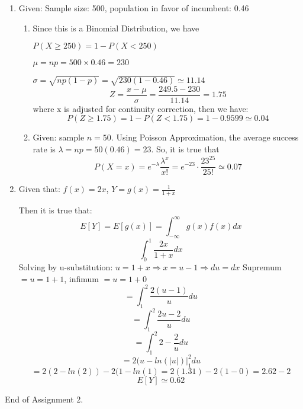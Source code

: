 \documentclass[12pt]{article}
\begin{document}
\begin{enumerate}
		\item Given: Sample size: 500, population in favor of incumbent: 0.46
			\begin{enumerate}
				\item Since this is a Binomial Distribution, we have

				$P(X \geq 250) = 1 - P(X < 250)$
				
				$\mu = np = 500 \times 0.46 = 230$
				
				$\sigma = \sqrt{np(1-p)} = \sqrt{230(1-0.46)} \simeq 11.14$
				$$Z = \frac{x - \mu}{\sigma} = \frac{249.5 - 230}{11.14} = 1.75$$
				where x is adjusted for continuity correction, then we have:
				$$P(Z \geq 1.75) = 1 - P(Z < 1.75) = 1 - 0.9599 \simeq 0.04$$
				
				\item Given: sample $n = 50$. Using Poisson Approximation, the average success rate is $\lambda = np = 50(0.46) = 23$. So, it is true that
				$$P(X = x) = e^{-\lambda} \frac{\lambda^x}{x!} = e^{-23} \cdot \frac{23^{25}}{25!} \simeq 0.07$$
				
				
				
				
				
			\end{enumerate}
			
		\item Given that: $f(x) = 2x$, $Y = g(x) = \frac{1}{1 + x}$
			
			Then it is true that:
			$$E[Y] = E[g(x)] = \int_{-\infty}^{\infty} g(x)f(x)dx$$
			$$\int_{0}^{1} \frac{2x}{1 + x}dx$$
			Solving by u-substitution: $u = 1 + x \Rightarrow x = u - 1 \Rightarrow du = dx$
			Supremum $= u = 1 + 1$, infimum $= u = 1 + 0$
			$$= \int_{1}^{2} \frac{2(u-1)}{u}du$$
			$$= \int_{1}^{2} \frac{2u-2}{u}du$$
			$$= \int_{1}^{2} 2 - \frac{2}{u}du$$
			$$= 2(u - ln(|u|)\vert_{1}^{2}du$$
			$$= 2(2 - ln(2)) - 2(1 - ln(1) = 2(1.31) - 2(1 - 0) = 2.62 - 2$$
			$$E[Y] \simeq 0.62$$
\end{enumerate}

End of Assignment 2.
\end{document}
